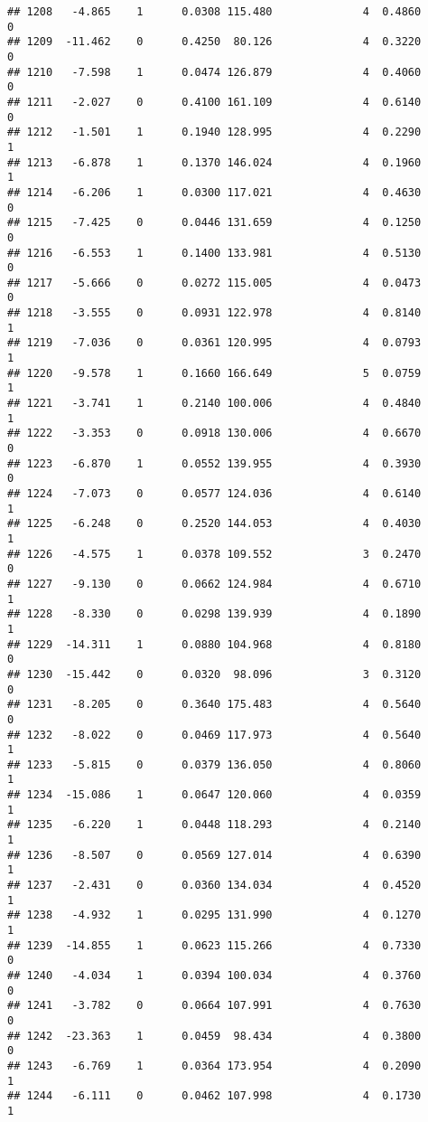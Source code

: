 \documentclass[
]{article}
\begin{document}
\begin{verbatim}
## 1208   -4.865    1      0.0308 115.480              4  0.4860      0
## 1209  -11.462    0      0.4250  80.126              4  0.3220      0
## 1210   -7.598    1      0.0474 126.879              4  0.4060      0
## 1211   -2.027    0      0.4100 161.109              4  0.6140      0
## 1212   -1.501    1      0.1940 128.995              4  0.2290      1
## 1213   -6.878    1      0.1370 146.024              4  0.1960      1
## 1214   -6.206    1      0.0300 117.021              4  0.4630      0
## 1215   -7.425    0      0.0446 131.659              4  0.1250      0
## 1216   -6.553    1      0.1400 133.981              4  0.5130      0
## 1217   -5.666    0      0.0272 115.005              4  0.0473      0
## 1218   -3.555    0      0.0931 122.978              4  0.8140      1
## 1219   -7.036    0      0.0361 120.995              4  0.0793      1
## 1220   -9.578    1      0.1660 166.649              5  0.0759      1
## 1221   -3.741    1      0.2140 100.006              4  0.4840      1
## 1222   -3.353    0      0.0918 130.006              4  0.6670      0
## 1223   -6.870    1      0.0552 139.955              4  0.3930      0
## 1224   -7.073    0      0.0577 124.036              4  0.6140      1
## 1225   -6.248    0      0.2520 144.053              4  0.4030      1
## 1226   -4.575    1      0.0378 109.552              3  0.2470      0
## 1227   -9.130    0      0.0662 124.984              4  0.6710      1
## 1228   -8.330    0      0.0298 139.939              4  0.1890      1
## 1229  -14.311    1      0.0880 104.968              4  0.8180      0
## 1230  -15.442    0      0.0320  98.096              3  0.3120      0
## 1231   -8.205    0      0.3640 175.483              4  0.5640      0
## 1232   -8.022    0      0.0469 117.973              4  0.5640      1
## 1233   -5.815    0      0.0379 136.050              4  0.8060      1
## 1234  -15.086    1      0.0647 120.060              4  0.0359      1
## 1235   -6.220    1      0.0448 118.293              4  0.2140      1
## 1236   -8.507    0      0.0569 127.014              4  0.6390      1
## 1237   -2.431    0      0.0360 134.034              4  0.4520      1
## 1238   -4.932    1      0.0295 131.990              4  0.1270      1
## 1239  -14.855    1      0.0623 115.266              4  0.7330      0
## 1240   -4.034    1      0.0394 100.034              4  0.3760      0
## 1241   -3.782    0      0.0664 107.991              4  0.7630      0
## 1242  -23.363    1      0.0459  98.434              4  0.3800      0
## 1243   -6.769    1      0.0364 173.954              4  0.2090      1
## 1244   -6.111    0      0.0462 107.998              4  0.1730      1

\end{verbatim}
\end{document}
